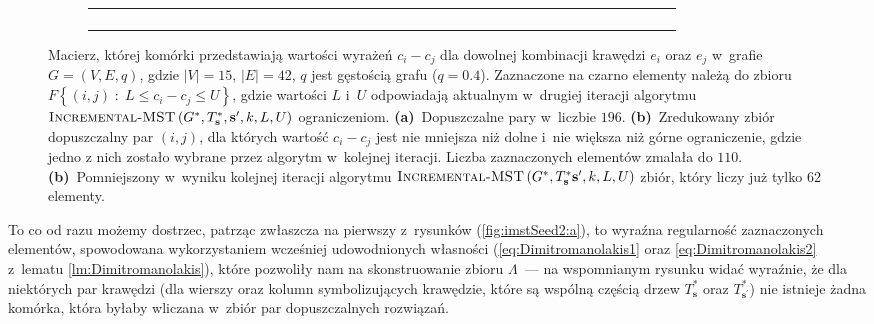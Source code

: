 \begin{figure}[!htbp]
\begin{subfigure}[b]{0.3\textwidth}
{\begin{tabu}{|c|c|c|c|c|c|c|c|c|c|c|c|c|c|c|c|c|c|c|c|c|c|c|c|c|c|c|c|c|c|c|c|c|c|c|c|c|c|c|c|c|c|}
				& & & & & & & & & & & & & & & & & & & & & & & & & & & & & & & & & & & & & & & & & \\\hline
				& & \cellcolor{black}	& & 	& & 	& & 	& & & & & & & & & & & & & \cellcolor{black}	& 	& & & 	& & 	& & & 	& & 	& 	& 	& & 	& & & & & 	\\\hline
				& & & & & & & & & & & & & & & & & & & & & & & & & & & & & & & & & & & & & & & & & \\\hline
				& & & & & & & & & & & & & & & & & & & & & & & & & & & & & & & & & & & & & & & & & \\\hline
				& & & & & & & & & & & & & & & & & & & & & & & & & & & & & & & & & & & & & & & & & \\\hline
			\end{tabu}%
		}
		\caption{}
		\label{fig:imstSeed2:c}
	\end{subfigure}
	\hfill\null
	\caption{
		Macierz, której komórki przedstawiają wartości wyrażeń $c_{i} - c_{j}$ dla dowolnej kombinacji krawędzi $e_{i}$ oraz $e_{j}$ w~grafie $G = \left( V, E, q \right)$, gdzie $\left| V \right| = 15$, $\left| E \right| = 42$, $q$ jest gęstością grafu ($q = 0.4$).
		Zaznaczone na czarno elementy należą do zbioru $F \left\{ \left( i, j \right) \; : \; L \leqslant c_{i} - c_{j} \leqslant U \right\}$, gdzie wartości $L$ i~$U$ odpowiadają aktualnym w~drugiej iteracji algorytmu $\textsc{Incremental-MST} \left( G^{\ast}, T^{\ast}_{\textbf{s}}, \textbf{s}^{\prime}, k, L, U \right)$ ograniczeniom.
		\textbf{(a)}~Dopuszczalne pary w~liczbie $196$.
		\textbf{(b)}~Zredukowany zbiór dopuszczalny par $\left( i, j \right)$, dla których wartość $c_{i} - c_{j}$ jest nie mniejsza niż dolne i~nie większa niż górne ograniczenie, gdzie jedno z nich zostało wybrane przez algorytm w~kolejnej iteracji.
		Liczba zaznaczonych elementów zmalała do $110$.
		\textbf{(b)}~Pomniejszony w~wyniku kolejnej iteracji algorytmu $\textsc{Incremental-MST} \left( G^{\ast}, T^{\ast}_{\textbf{s}} \textbf{s}^{\prime}, k, L, U \right)$ zbiór, który liczy już tylko $62$ elementy.
	}
	\label{fig:imstSeed2}
\end{figure}

To co od razu możemy dostrzec, patrząc zwłaszcza na pierwszy z~rysunków (\ref{fig:imstSeed2:a}), to wyraźna regularność zaznaczonych elementów, spowodowana wykorzystaniem wcześniej udowodnionych własności (\ref{eq:Dimitromanolakis1} oraz \ref{eq:Dimitromanolakis2} z~lematu \ref{lm:Dimitromanolakis}), które pozwoliły nam na skonstruowanie zbioru $\Lambda$~--- na wspomnianym rysunku widać wyraźnie, że dla niektórych par krawędzi (dla wierszy oraz kolumn symbolizujących krawędzie, które są wspólną częścią drzew $T^{\ast}_{\textbf{s}}$ oraz $T^{\ast}_{\textbf{s}^{\prime}}$) nie istnieje żadna komórka, która byłaby wliczana w~zbiór par dopuszczalnych rozwiązań.

